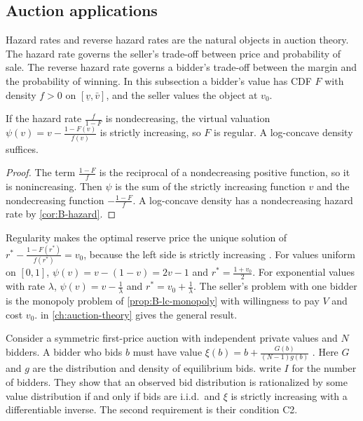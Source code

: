 \subsection{Auction applications}\label{sec:B-lc-auctions}

Hazard rates and reverse hazard rates are the natural objects in auction theory. The hazard rate governs the
seller's trade-off between price and probability of sale. The reverse hazard rate governs a bidder's trade-off
between the margin and the probability of winning. In this subsection a bidder's value has CDF $F$ with density
$f > 0$ on $[\underline v, \bar v]$, and the seller values the object at $v_0$.

\begin{proposition}\label{prop:B-regular}
If the hazard rate $\frac{f}{1 - F}$ is nondecreasing, the virtual valuation
$\psi(v) = v - \frac{1 - F(v)}{f(v)}$ is strictly increasing, so $F$ is regular. A log-concave density suffices.
\end{proposition}

\begin{proof}
The term $\frac{1 - F}{f}$ is the reciprocal of a nondecreasing positive function, so it is nonincreasing. Then
$\psi$ is the sum of the strictly increasing function $v$ and the nondecreasing function $-\frac{1 - F}{f}$. A
log-concave density has a nondecreasing hazard rate by \cref{cor:B-hazard}.
\end{proof}

Regularity makes the optimal reserve price the unique solution of $r^* - \frac{1 - F(r^*)}{f(r^*)} = v_0$, because
the left side is strictly increasing \citep{Myerson1981}. For values uniform on $[0, 1]$,
$\psi(v) = v - (1 - v) = 2v - 1$ and $r^* = \frac{1 + v_0}{2}$. For exponential values with rate $\lambda$,
$\psi(v) = v - \frac{1}{\lambda}$ and $r^* = v_0 + \frac{1}{\lambda}$. The seller's problem with one bidder is the monopoly
problem of \cref{prop:B-lc-monopoly} with willingness to pay $V$ and cost $v_0$.  in
\cref{ch:auction-theory} gives the general result.

Consider a symmetric first-price auction with independent private values and $N$ bidders. A bidder who bids $b$
must have value $\xi(b) = b + \frac{G(b)}{(N - 1)g(b)}$ \citep{GuerrePerrigneVuong2000}. Here $G$ and $g$ are the
distribution and density of equilibrium bids. \citet[Theorem 1]{GuerrePerrigneVuong2000} write $I$ for the number of
bidders. They show that an observed bid distribution is rationalized by some value distribution if and only if
bids are i.i.d.\ and $\xi$ is strictly increasing with a differentiable inverse. The second requirement is their
condition C2.

